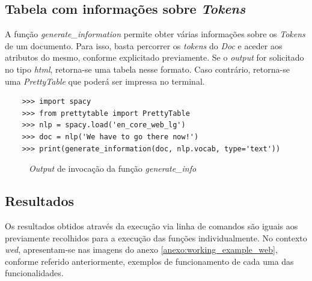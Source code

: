 \documentclass[12pt]{article}
\begin{document}
\subsection{Tabela com informações sobre \textit{Tokens}}

A função \textit{generate\_information} permite obter várias informações sobre os \textit{Tokens} de um documento. Para isso, basta percorrer os \textit{tokens} do \textit{Doc} e aceder aos atributos do mesmo, conforme explicitado previamente. Se o \textit{output} for solicitado no tipo \textit{html}, retorna-se uma tabela nesse formato. Caso contrário, retorna-se uma \textit{PrettyTable} que poderá ser impressa no terminal.

\begin{verbatim}
	>>> import spacy
	>>> from prettytable import PrettyTable
	>>> nlp = spacy.load('en_core_web_lg')
	>>> doc = nlp('We have to go there now!')
	>>> print(generate_information(doc, nlp.vocab, type='text'))
\end{verbatim}

\begin{figure}[!ht]
	\centering
	\setlength{\abovecaptionskip}{-.5cm}
	\caption{\textit{Output} de invocação da função \textit{generate\_info}}
	\label{figure:table-info}
\end{figure}

\subsection{Resultados}

Os resultados obtidos através da execução via linha de comandos são iguais aos previamente recolhidos para a execução das funções individualmente. No contexto \textit{wed}, apresentam-se nas imagens do anexo \ref{anexo:working_example_web}, conforme referido anteriormente, exemplos de funcionamento de cada uma das funcionalidades.



\setcounter{section}{0}
\setcounter{subsection}{0}


\newpage

\appendixpage
\renewcommand{\thesubsection}{\Alph{subsection}}
\end{document}
